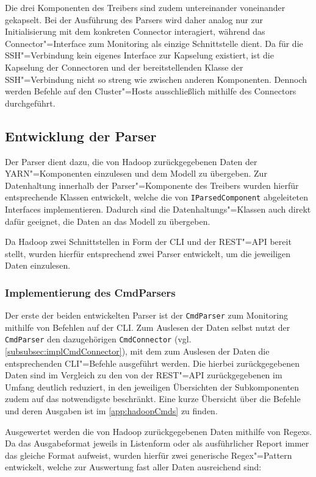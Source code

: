 Die drei Komponenten des Treibers sind zudem untereinander  voneinander gekapselt.
Bei der Ausführung des Parsers wird daher analog nur zur Initialisierung mit dem konkreten Connector interagiert, während das Connector"=Interface zum Monitoring als einzige Schnittstelle dient.
Da für die SSH"=Verbindung kein eigenes Interface zur Kapselung existiert, ist die Kapselung der Connectoren und der bereitstellenden Klasse der SSH"=Verbindung nicht so streng wie zwischen anderen Komponenten.
Dennoch werden Befehle auf den Cluster"=Hosts ausschließlich mithilfe des Connectors durchgeführt.

\subsection{Entwicklung der Parser}
\label{subsec:implementedParsers}

Der Parser dient dazu, die von Hadoop zurückgegebenen Daten der YARN"=Komponenten einzulesen und dem Modell zu übergeben.
Zur Datenhaltung innerhalb der Parser"=Komponente des Treibers wurden hierfür entsprechende Klassen entwickelt, welche die von \texttt{IParsedComponent} abgeleiteten Interfaces implementieren.
Dadurch sind die Datenhaltungs"=Klassen auch direkt dafür geeignet, die Daten an das Modell zu übergeben.

Da Hadoop zwei Schnittstellen in Form der CLI und der REST"=API bereit stellt, wurden hierfür entsprechend zwei Parser entwickelt, um die jeweiligen Daten einzulesen.

\subsubsection{Implementierung des CmdParsers}
\label{subsubsec:implCmdParser}

Der erste der beiden entwickelten Parser ist der \texttt{CmdParser} zum Monitoring mithilfe von Befehlen auf der CLI.
Zum Auslesen der Daten selbst nutzt der \texttt{CmdParser} den dazugehörigen \texttt{CmdConnector} (vgl. \cref{subsubsec:implCmdConnector}), mit dem zum Auslesen der Daten die entsprechenden CLI"=Befehle ausgeführt werden.
Die hierbei zurückgegebenen Daten sind im Vergleich zu den von der REST"=API zurückgegebenen im Umfang deutlich reduziert, in den jeweiligen Übersichten der Subkomponenten zudem auf das notwendigste beschränkt.
Eine kurze Übersicht über die Befehle und deren Ausgaben ist im \cref{app:hadoopCmds} zu finden.

Ausgewertet werden die von Hadoop zurückgegebenen Daten mithilfe von \acp{Regex}.
Da das Ausgabeformat jeweils in Listenform oder als ausführlicher Report immer das gleiche Format aufweist, wurden hierfür zwei generische Regex"=Pattern entwickelt, welche zur Auswertung fast aller Daten ausreichend sind:


